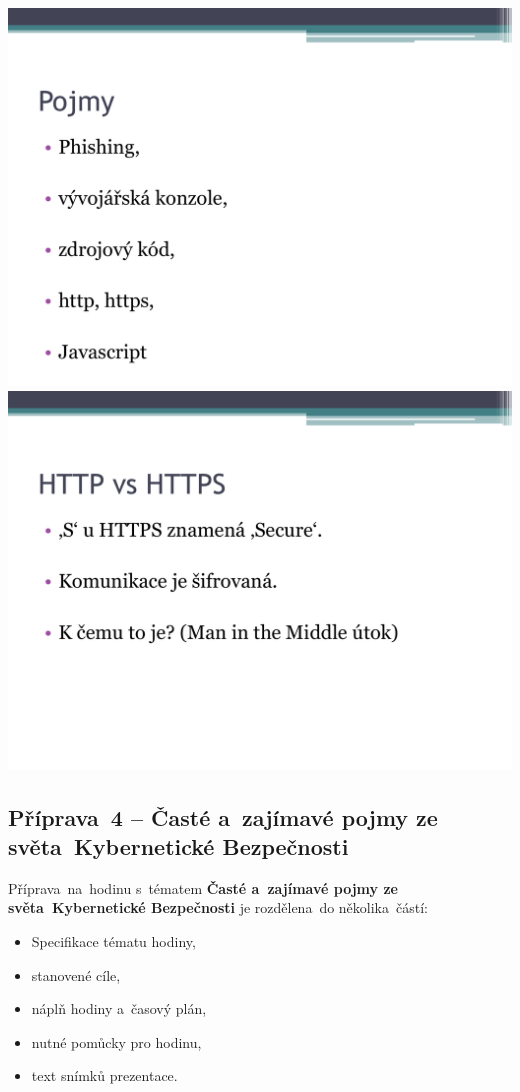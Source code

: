 \documentclass[a4paper, 12pt]{article}
\begin{document}
\vspace{0.5in}
\includegraphics[scale=0.5]{GeneralSecuritySlides/p03.pdf} \\
\vspace{0.5in}
\includegraphics[scale=0.5]{GeneralSecuritySlides/p04.pdf} \\


\subsection{Příprava~4 -- Časté a~zajímavé pojmy ze světa~Kybernetické Bezpečnosti}
Příprava~na~hodinu s~tématem \textbf{Časté a~zajímavé pojmy ze světa~Kybernetické Bezpečnosti} je rozdělena~do několika~částí:
\begin{itemize}
        \setlength{\itemsep}{-3pt}
        \item Specifikace tématu hodiny,
        \item stanovené cíle,
        \item náplň hodiny a~časový plán,
        \item nutné pomůcky pro hodinu,
        \item text snímků prezentace.
\end{itemize}
\end{document}
